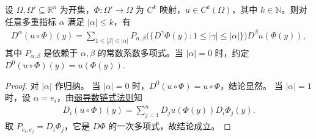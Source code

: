 \documentclass[../../main.tex]{subfiles}%
\begin{document}
\begin{lemma}\label{lemma:高阶链式法则多项式表示}
设 $\Omega,\Omega'\subseteq\mathbb{R}^n$ 为开集，$\Phi:\Omega'\to\Omega$ 为 $C^k$ 映射，$u\in C^k(\Omega)$，其中 $k\in\mathbb{N}$。则对任意多重指标 $\alpha$ 满足 $|\alpha|\leqslant k$，有
\begin{align*}
D^\alpha(u\circ\Phi)(y)=\sum\limits_{1\leqslant|\beta|\leqslant|\alpha|}P_{\alpha,\beta}\bigl(\{D^\gamma\Phi(y):1\leqslant|\gamma|\leqslant|\alpha|\}\bigr)D^\beta u(\Phi(y)),
\end{align*}
其中 $P_{\alpha,\beta}$ 是依赖于 $\alpha,\beta$ 的常数系数多项式。当 $|\alpha|=0$ 时，约定$D^0(u\circ\Phi)(y)=u(\Phi(y)).$
\end{lemma}
\begin{proof}

对 $|\alpha|$ 作归纳。
当 $|\alpha|=0$ 时，$D^0(u\circ\Phi)=u\circ\Phi$，结论显然。
当 $|\alpha|=1$ 时，设 $\alpha=e_i$，由\hyperref[theorem:弱导数链式法则]{弱导数链式法则}知
\begin{align*}
D_i(u\circ\Phi)(y)=\sum\limits_{j=1}^n D_j u(\Phi(y))D_i\Phi_j(y).
\end{align*}
取 $P_{e_i,e_j}=D_i\Phi_j$，它是 $D\Phi$ 的一次多项式，故结论成立。


\end{proof}
\end{document}
